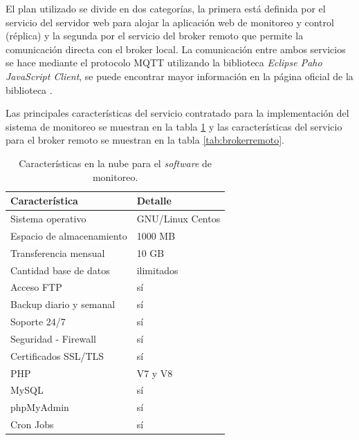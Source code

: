 El plan utilizado se divide en dos categorías, la primera está definida por el servicio del servidor web para alojar la aplicación web de monitoreo y control (réplica) y la segunda por el servicio del broker remoto que permite la comunicación directa con el broker local. La comunicación entre ambos servicios se hace mediante el protocolo MQTT utilizando la biblioteca  \emph{Eclipse Paho JavaScript Client}, se puede encontrar mayor información en la página oficial de la biblioteca \citep{WEBSITE:41}. 

Las principales características  del servicio contratado para la implementación del sistema de monitoreo se muestran en la tabla \ref{tab:serverweb} y las características del servicio para el broker remoto se muestran en la tabla  \ref{tab:brokerremoto}.


\begin{table}[h]
	\centering
	\caption[Características del servicio en la nube]{Características en la nube para el \emph{software} de monitoreo.}
	\begin{tabular}{p{7cm} p{5cm} }    
		\toprule
		\textbf{Característica} 	 & \textbf{Detalle}  \\
		\midrule
		Sistema operativo  & GNU/Linux Centos\\		
		Espacio de almacenamiento & 1000 MB \\
		Transferencia mensual  & 10 GB\\				
		Cantidad base de datos 	  & ilimitados\\
		Acceso FTP 	  & sí\\
		Backup diario y semanal 	  & sí\\
		Soporte 24/7 	  & sí\\
		Seguridad - Firewall	  & sí\\
		Certificados SSL/TLS	  & sí\\
		PHP	  & V7 y V8\\
		MySQL	  & sí\\
		phpMyAdmin	  & sí\\
		Cron Jobs	  & sí\\
		\bottomrule
		\hline
	\end{tabular}
	\label{tab:serverweb}
\end{table}


